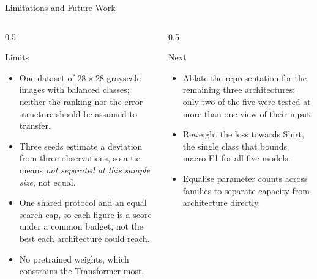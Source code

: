 \begin{frame}{Limitations and Future Work}
\small
\begin{columns}[T]
\begin{column}{0.5\textwidth}
\begin{block}{Limits}
\begin{itemize}
    \item One dataset of $28\times28$ grayscale images with balanced classes; neither the ranking nor
          the error structure should be assumed to transfer.
    \item Three seeds estimate a deviation from three observations, so a tie means \emph{not separated
          at this sample size}, not equal.
    \item One shared protocol and an equal search cap, so each figure is a score under a common
          budget, not the best each architecture could reach.
    \item No pretrained weights, which constrains the Transformer most.
\end{itemize}
\end{block}
\end{column}
\begin{column}{0.5\textwidth}
\begin{block}{Next}
\begin{itemize}
    \item Ablate the representation for the remaining three architectures; only two of the five were
          tested at more than one view of their input.
    \item Reweight the loss towards Shirt, the single class that bounds macro-F1 for all five models.
    \item Equalise parameter counts across families to separate capacity from architecture directly.
\end{itemize}
\end{block}
\end{column}
\end{columns}
\end{frame}
